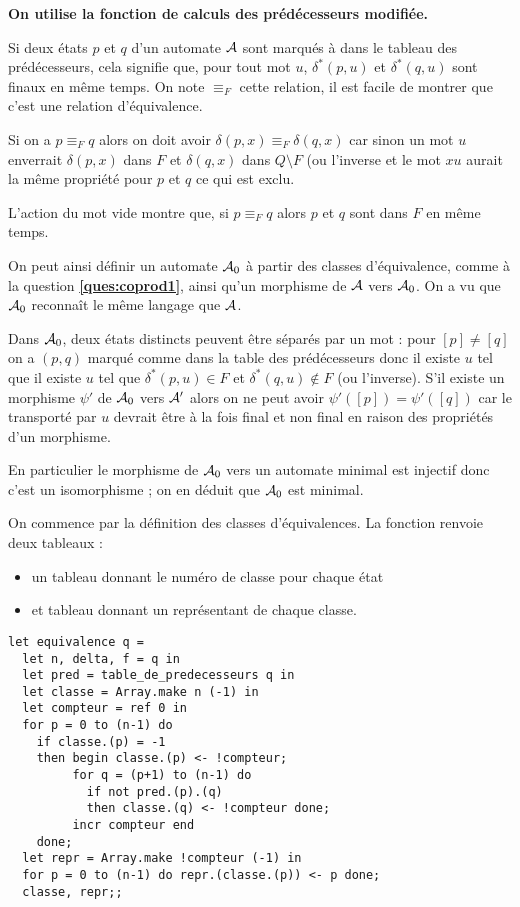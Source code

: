 \begin{Exercise}
{\bf On utilise la fonction de calculs des prédécesseurs modifiée.}

Si deux états $p$ et $q$ d'un automate ${\cal A}$ sont marqués à  dans le tableau des prédécesseurs, cela signifie que, pour tout mot $u$, $\delta^*(p, u)$ et $\delta^*(q, u)$ sont finaux en même temps. On note $\equiv_F$ cette relation, il est facile de montrer que c'est une relation d'équivalence.

Si on a $p\equiv_Fq$ alors on doit avoir $\delta(p, x) \equiv_F \delta(q, x)$ car sinon un mot $u$ enverrait $\delta(p, x)$ dans $F$ et $\delta(q, x)$ dans $Q\setminus F$ (ou l'inverse et le mot $xu$ aurait la même propriété pour $p$ et $q$ ce qui est exclu.

L'action du mot vide montre que, si $p\equiv_F q$ alors $p$ et $q$ sont dans $F$ en même temps.

\medskip

On peut ainsi définir un automate ${\cal A}_0$ à partir des classes d'équivalence, comme à la question {\bf \ref{ques:coprod1}},  ainsi qu'un morphisme de ${\cal A}$ vers ${\cal A}_0$. On a vu que ${\cal A}_0$ reconnaît le même langage que ${\cal A}$.

Dans ${\cal A}_0$, deux états distincts peuvent être séparés par un mot : pour $[p] \ne [q]$ on a $(p, q)$ marqué comme  dans la table des prédécesseurs donc il existe $u$ tel que il existe $u$ tel que $\delta^*(p, u)\in F$ et $\delta^*(q, u)\not \in F$ (ou l'inverse). S'il existe un morphisme $\psi'$ de ${\cal A}_0$ vers ${\cal A}'$ alors on ne peut avoir $\psi'([p]) = \psi'([q])$ car le transporté par $u$ devrait être à la fois final et non final en raison des propriétés d'un morphisme.

En particulier le morphisme de ${\cal A}_0$ vers un automate minimal est injectif donc c'est un isomorphisme ; on en déduit que ${\cal A}_0$ est minimal.

\newpage

On commence par la définition des classes d'équivalences. La fonction renvoie deux tableaux :
\begin{itemize}
  \item un tableau donnant le numéro de classe pour chaque état 
  \item et tableau donnant un représentant de chaque classe.
\end{itemize}
\begin{lstlisting}
let equivalence q = 
  let n, delta, f = q in
  let pred = table_de_predecesseurs q in
  let classe = Array.make n (-1) in
  let compteur = ref 0 in
  for p = 0 to (n-1) do
    if classe.(p) = -1
    then begin classe.(p) <- !compteur;
         for q = (p+1) to (n-1) do
           if not pred.(p).(q) 
           then classe.(q) <- !compteur done;
         incr compteur end 
    done;
  let repr = Array.make !compteur (-1) in
  for p = 0 to (n-1) do repr.(classe.(p)) <- p done; 
  classe, repr;;        
\end{lstlisting}


\end{Exercise}
